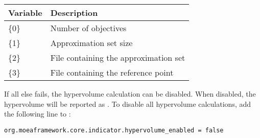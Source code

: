 \begin{center}
\begin{tabular}{ll}
  Variable & Description \\
  \hline
  \{0\} & Number of objectives \\
  \{1\} & Approximation set size \\
  \{2\} & File containing the approximation set \\
  \{3\} & File containing the reference point
\end{tabular}
\end{center}

If all else fails, the hypervolume calculation can be disabled.  When disabled, the hypervolume will be reported as .  To disable all hypervolume calculations, add the following line to :

\begin{lstlisting}[language=Plaintext]
org.moeaframework.core.indicator.hypervolume_enabled = false
\end{lstlisting}
